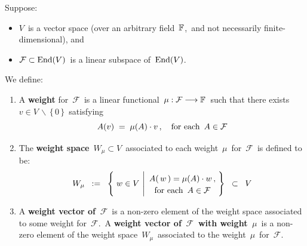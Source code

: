 
\vskip 0.5cm
\begin{definition}
\mbox{}
\vskip 0.05cm
\noindent
Suppose:
\begin{itemize}
\item
    $V$\, is a vector space
    (over an arbitrary field \,$\mathbb{F}$,\, and not necessarily finite-dimensional), and
\item
    $\mathcal{F} \subset \textnormal{End}(V)$\, is a linear subspace of \,$\textnormal{End}(V)$.
\end{itemize}
We define:
\begin{enumerate}
\item
    A \textbf{weight} for \,$\mathcal{F}$\, is a linear functional
    \,$\mu : \mathcal{F} \longrightarrow \mathbb{F}$\,
    such that there exists \,$v \in V \,\backslash\, \{\,0\,\}$\,
    satisfying
    \begin{equation*}
    A(v) \; = \; \mu({A}) \cdot v\,,
    \quad
    \textnormal{for each \,$A \in \mathcal{F}$}
    \end{equation*}
\item
	The \textbf{weight space} \,$W_{\mu} \subset V$\,
	associated to each weight \,$\mu$\, for \,$\mathcal{F}$\,
	is defined to be:
    \begin{equation*}
    W_{\mu}
    \;\; := \;\;
        \left\{\;
            w \in V
            \,\left\vert
            \begin{array}{c}
                A(\,w\,) \overset{{\color{white}1}}{=} \mu(A) \cdot w\,,
                \\
                \overset{{\color{white}.}}{\textnormal{for each \,$A \in \mathcal{F}$}}
                \end{array}
            \right.
            \!\!\right\}
    \;\; \subset \;\;
        V
    \end{equation*}
\item
    A \textbf{weight vector of \,$\mathcal{F}$}\, is a non-zero element
    of the weight space associated to some weight for \,$\mathcal{F}$.\,
    A \textbf{weight vector of \,$\mathcal{F}$\, with weight \,$\mu$}\,
    is a non-zero element of the weight space \,$W_{\mu}$\,
    associated to the weight \,$\mu$\, for \,$\mathcal{F}$. 
\end{enumerate}
\end{definition}


